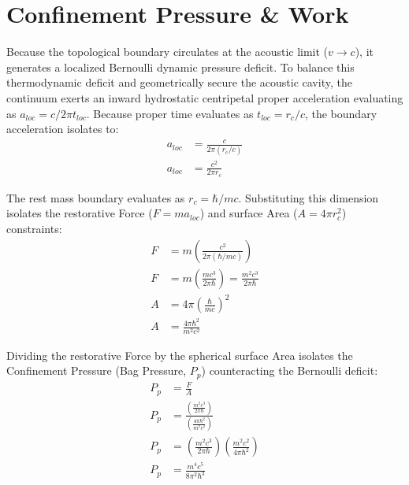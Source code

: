 \section{Confinement Pressure \& Work}
\label{sec:deriv_bag_pressure}

Because the topological boundary circulates at the acoustic limit ($v \to c$), it generates a localized Bernoulli dynamic pressure deficit. To balance this thermodynamic deficit and geometrically secure the acoustic cavity, the continuum exerts an inward hydrostatic centripetal proper acceleration evaluating as $a_{loc} = c/2\pi t_{loc}$. Because proper time evaluates as $t_{loc} = r_c/c$, the boundary acceleration isolates to:
\begin{align}
    a_{loc} &= \frac{c}{2\pi (r_c/c)} \nonumber \\
    a_{loc} &= \frac{c^2}{2\pi r_c}
\end{align}

The rest mass boundary evaluates as $r_c = \hbar/mc$. Substituting this dimension isolates the restorative Force ($F = m a_{loc}$) and surface Area ($A = 4\pi r_c^2$) constraints:
\begin{align}
    F &= m \left( \frac{c^2}{2\pi (\hbar/mc)} \right) \nonumber \\
    F &= m \left( \frac{m c^3}{2\pi \hbar} \right) = \frac{m^2 c^3}{2\pi \hbar} \\[8pt]
    A &= 4\pi \left( \frac{\hbar}{mc} \right)^2 \nonumber \\
    A &= \frac{4\pi \hbar^2}{m^2 c^2}
\end{align}

Dividing the restorative Force by the spherical surface Area isolates the Confinement Pressure (Bag Pressure, $P_p$) counteracting the Bernoulli deficit:
\begin{align}
    P_p &= \frac{F}{A} \nonumber \\
    P_p &= \frac{\left( \frac{m^2 c^3}{2\pi \hbar} \right)}{\left( \frac{4\pi \hbar^2}{m^2 c^2} \right)} \nonumber \\
    P_p &= \left( \frac{m^2 c^3}{2\pi \hbar} \right) \left( \frac{m^2 c^2}{4\pi \hbar^2} \right) \nonumber \\
    P_p &= \frac{m^4 c^5}{8\pi^2 \hbar^3} \label{eq:pp_derived}
\end{align}

